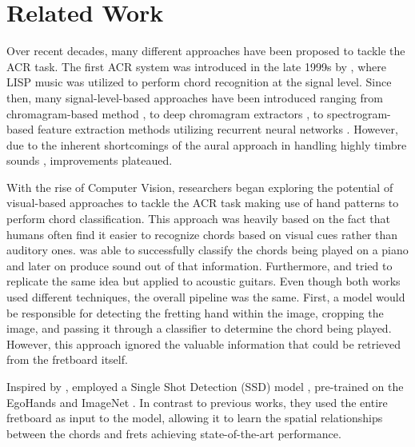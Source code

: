 \documentclass[10pt,twocolumn,letterpaper]{article}
\begin{document}

\section{Related Work}
Over recent decades, many different approaches have been proposed to tackle the ACR task. The first ACR system was introduced in the late 1999s by \cite{takuya1999realtime}, where LISP music was utilized to perform chord recognition at the signal level. Since then, many signal-level-based approaches have been introduced ranging from chromagram-based method \cite{stark2009real}, to deep chromagram extractors \cite{korzeniowski2016feature}, to spectrogram-based feature extraction methods utilizing recurrent neural networks \cite{boulanger2013audio}. However, due to the inherent shortcomings of the aural approach in handling highly timbre sounds \cite{du2023conditional}, improvements plateaued.

With the rise of Computer Vision, researchers began exploring the potential of visual-based approaches to tackle the ACR task making use of hand patterns to perform chord classification. This approach was heavily based on the fact that humans often find it easier to recognize chords based on visual cues rather than auditory ones. \cite{su2020audeo} was able to successfully classify the chords being played on a piano and later on produce sound out of that information. Furthermore, \cite{tran2019cnn} and \cite{ooaku2018guitar} tried to replicate the same idea but applied to acoustic guitars. Even though both works used different techniques, the overall pipeline was the same. First, a model would be responsible for detecting the fretting hand within the image, cropping the image, and passing it through a classifier to determine the chord being played. However, this approach ignored the valuable information that could be retrieved from the fretboard itself.

Inspired by \cite{tran2019cnn, ooaku2018guitar}, \cite{Kristian_Zaman_Tenoyo_Jodhinata_2024} employed a Single Shot Detection (SSD) model \cite{sandler2018mobilenetv2}, pre-trained on the EgoHands \cite{Bambach_2015_ICCV} and ImageNet \cite{deng2009imagenet}. In contrast to previous works, they used the entire fretboard as input to the model, allowing it to learn the spatial relationships between the chords and frets achieving state-of-the-art performance.
\end{document}
